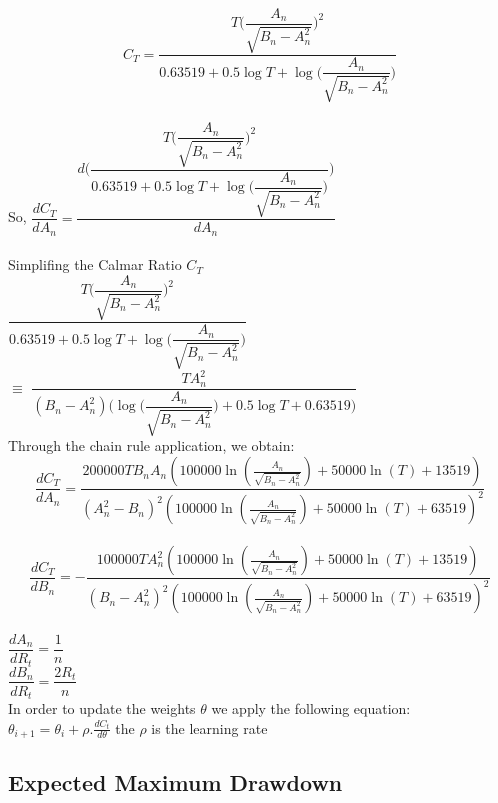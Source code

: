 \documentclass[parskip=full]{scrartcl}
\begin{document}
$$ C_T  = \dfrac{T\bigg(\dfrac{A_n}{\sqrt{B_n - A_{n}^{2}}}\bigg)^2}{0.63519 + 0.5\log T + \log \bigg(\dfrac{A_n}{\sqrt{B_n - A_{n}^{2}}}\bigg)}$$\\

So, $\dfrac{dC_T}{dA_n} = \dfrac{d\Bigg(\dfrac{T\bigg(\dfrac{A_n}{\sqrt{B_n - A_{n}^{2}}}\bigg)^2}{0.63519 + 0.5\log T + \log \bigg(\dfrac{A_n}{\sqrt{B_n - A_{n}^{2}}}\bigg)}\Bigg)}{dA_n}$\\
\\

Simplifing the Calmar Ratio $C_T$\\

$\dfrac{T\bigg(\dfrac{A_n}{\sqrt{B_n - A_{n}^{2}}}\bigg)^2}{0.63519 + 0.5\log T + \log \bigg(\dfrac{A_n}{\sqrt{B_n - A_{n}^{2}}}\bigg)}$\\
$ \equiv$
$\dfrac{TA_{n}^{2}}{(B_n - A_{n}^{2})\bigg(\log \bigg(\dfrac{A_n}{\sqrt{B_n - A_{n}^{2}}}\bigg)+ 0.5\log T + 0.63519\bigg)}$\\

Through the chain rule application, we obtain:\\

$$ \dfrac{dC_T}{dA_n} = \dfrac{200000TB_nA_n\left(100000\ln\left(\frac{A_n}{\sqrt{B_n-A_{n}^{2}}}\right)+50000\ln\left(T\right)+13519\right)}{\left(A_{n}^{2}-B_n\right)^2\left(100000\ln\left(\frac{A_n}{\sqrt{B_n-A_{n}^{2}}}\right)+50000\ln\left(T\right)+63519\right)^2} $$\\

$$ \dfrac{dC_T}{dB_n} = -\dfrac{100000TA_{n}^{2}\left(100000\ln\left(\frac{A_n}{\sqrt{B_n-A_{n}^{2}}}\right)+50000\ln\left(T\right)+13519\right)}{\left(B_n-A_{n}^{2}\right)^2\left(100000\ln\left(\frac{A_n}{\sqrt{B_n-A_{n}^{2}}}\right)+50000\ln\left(T\right)+63519\right)^2}$$\\


$ \dfrac{dA_n}{dR_t} = \dfrac{1}{n}$\\

$ \dfrac{dB_n}{dR_t} = \dfrac{2R_t}{n}$\\


In order to update the weights $\theta$ we apply the following equation:\\


$ \theta_{i+1} = \theta_{i} + \rho.\frac{dC_t}{d\theta}$ the $\rho $ is the learning rate

\subsection{Expected Maximum Drawdown}
\end{document}
